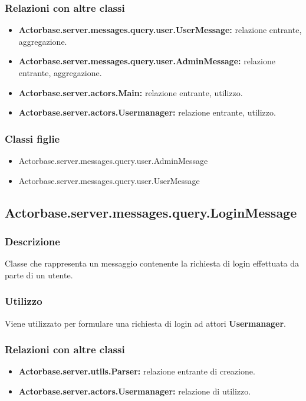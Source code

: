 \documentclass[a4paper]{article}
\begin{document}
			\subsubsection{Relazioni con altre classi}
				\begin{itemize}
					\item \textbf{Actorbase.server.messages.query.user.UserMessage:} relazione entrante, aggregazione.
					\item \textbf{Actorbase.server.messages.query.user.AdminMessage:} relazione entrante, aggregazione.
					\item \textbf{Actorbase.server.actors.Main:} relazione entrante, utilizzo.
					\item \textbf{Actorbase.server.actors.Usermanager:} relazione entrante, utilizzo.
				\end{itemize}
			\subsubsection{Classi figlie}
				\begin{itemize}
					\item Actorbase.server.messages.query.user.AdminMessage
					\item Actorbase.server.messages.query.user.UserMessage
				\end{itemize}
				
				
		\subsection{Actorbase.server.messages.query.LoginMessage}
			\subsubsection{Descrizione}
				Classe che rappresenta un messaggio contenente la richiesta di login effettuata da parte di un utente.
				
			\subsubsection{Utilizzo}
				Viene utilizzato per formulare una richiesta di login ad attori \textbf{Usermanager}.
				
			\subsubsection{Relazioni con altre classi}
				\begin{itemize}
					\item \textbf{Actorbase.server.utils.Parser:} relazione entrante di creazione.
					\item \textbf{Actorbase.server.actors.Usermanager:} relazione di utilizzo.
				\end{itemize}
\end{document}
